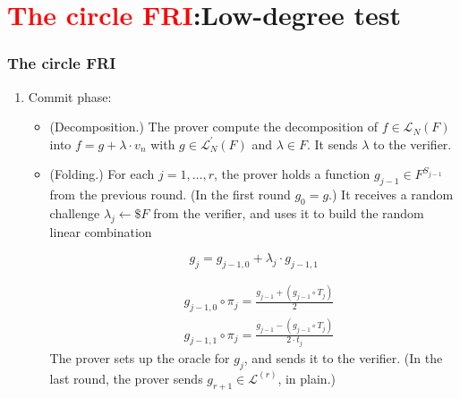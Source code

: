 \documentclass{beamer}
\begin{document}
\section{\textcolor{red}{The circle FRI}:Low-degree test}
\begin{frame}
\frametitle{The circle FRI}

\begin{enumerate}
	\item Commit phase:
	\begin{itemize}
		\item (Decomposition.) The prover compute the decomposition of $f \in \mathcal{L}_N(F)$ into $f=g+\lambda \cdot v_n$ with $g \in \mathcal{L}_N^{\prime}(F)$ and $\lambda \in F$. It sends $\lambda$ to the verifier.
		\item (Folding.) For each $j=1, \ldots, r$,  the prover holds a function $g_{j-1} \in F^{S_{j-1}}$ from the previous round. (In the first round $g_0=g$.) It receives a random challenge $\lambda_j \leftarrow \$ F$ from the verifier, and uses it to build the random linear combination

$$
g_j=g_{j-1,0}+\lambda_j \cdot g_{j-1,1}
$$

$$
\begin{aligned}
& g_{j-1,0} \circ \pi_j=\frac{g_{j-1}+\left(g_{j-1} \circ T_j\right)}{2} \\
& g_{j-1,1} \circ \pi_j=\frac{g_{j-1}-\left(g_{j-1} \circ T_j\right)}{2 \cdot t_j}
\end{aligned}
$$
 The prover sets up the oracle for $g_j$, and sends it to the verifier. (In the last round, the prover sends $g_{r+1} \in \mathcal{L}^{(r)}$, in plain.)

	\end{itemize}
	\end{enumerate}


\end{frame}
\end{document}
